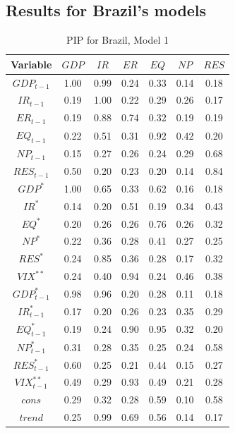 \documentclass[a4paper, twoside]{templates/ociamthesis}
\begin{document}
\clearpage

\hypertarget{appendixdPIPBR}{%
\subsection{Results for Brazil's models}\label{appendixdPIPBR}}

\begin{table}[!ht]

\caption{\label{tab:TablePIPBR1}PIP for Brazil, Model 1}
\centering
\fontsize{8}{10}\selectfont
\begin{tabular}[t]{ccccccc}
\toprule
Variable & $GDP$ & $IR$ & $ER$ & $EQ$ & $NP$ & $RES$\\
\midrule
$GDP_{t-1}$ & 1.00 & 0.99 & 0.24 & 0.33 & 0.14 & 0.18\\
$IR_{t-1}$ & 0.19 & 1.00 & 0.22 & 0.29 & 0.26 & 0.17\\
$ER_{t-1}$ & 0.19 & 0.88 & 0.74 & 0.32 & 0.19 & 0.19\\
$EQ_{t-1}$ & 0.22 & 0.51 & 0.31 & 0.92 & 0.42 & 0.20\\
$NP_{t-1}$ & 0.15 & 0.27 & 0.26 & 0.24 & 0.29 & 0.68\\
$RES_{t-1}$ & 0.50 & 0.20 & 0.23 & 0.20 & 0.14 & 0.84\\
$GDP^*$ & 1.00 & 0.65 & 0.33 & 0.62 & 0.16 & 0.18\\
$IR^*$ & 0.14 & 0.20 & 0.51 & 0.19 & 0.34 & 0.43\\
$EQ^*$ & 0.20 & 0.26 & 0.26 & 0.76 & 0.26 & 0.32\\
$NP^*$ & 0.22 & 0.36 & 0.28 & 0.41 & 0.27 & 0.25\\
$RES^*$ & 0.24 & 0.85 & 0.36 & 0.28 & 0.17 & 0.32\\
$VIX^{**}$ & 0.24 & 0.40 & 0.94 & 0.24 & 0.46 & 0.38\\
$GDP^*_{t-1}$ & 0.98 & 0.96 & 0.20 & 0.28 & 0.11 & 0.18\\
$IR^*_{t-1}$ & 0.17 & 0.20 & 0.26 & 0.23 & 0.35 & 0.29\\
$EQ^*_{t-1}$ & 0.19 & 0.24 & 0.90 & 0.95 & 0.32 & 0.20\\
$NP^*_{t-1}$ & 0.31 & 0.28 & 0.35 & 0.25 & 0.24 & 0.58\\
$RES^*_{t-1}$ & 0.60 & 0.25 & 0.21 & 0.44 & 0.15 & 0.27\\
$VIX^{**}_{t-1}$ & 0.49 & 0.29 & 0.93 & 0.49 & 0.21 & 0.28\\
$cons$ & 0.29 & 0.32 & 0.28 & 0.59 & 0.10 & 0.58\\
$trend$ & 0.25 & 0.99 & 0.69 & 0.56 & 0.14 & 0.17\\
\bottomrule
\end{tabular}
\end{table}
\end{document}
